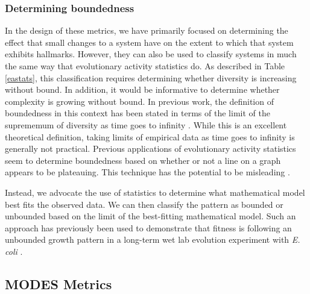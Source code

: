 \documentclass[letterpaper]{article}
\begin{document}
\subsubsection{Determining boundedness}

In the design of these metrics, we have primarily focused on determining the effect that small changes to a system have on the extent to which that system exhibits hallmarks. However, they can also be used to classify systems in much the same way that evolutionary activity statistics do. As described in Table \ref{eastats}, this classification requires determining whether diversity is increasing without bound. In addition, it would be informative to determine whether complexity is growing without bound. In previous work, the definition of boundedness in this context has been stated in terms of the limit of the suprememum of diversity as time goes to infinity \citep{bedau_classification_1998}. While this is an excellent theoretical definition, taking limits of empirical data as time goes to infinity is generally not practical. Previous applications of evolutionary activity statistics seem to determine boundedness based on whether or not a line on a graph appears to be plateauing. This technique has the potential to be misleading \citep{wiser_boundedness_2018}.

Instead, we advocate the use of statistics to determine what mathematical model best fits the observed data. We can then classify the pattern as bounded or unbounded based on the limit of the best-fitting mathematical model. Such an approach has previously been used to demonstrate that fitness is following an unbounded growth pattern in a long-term wet lab evolution experiment with \textit{E. coli} \citep{wiser_long-term_2013, lenski_sustained_2015}.

\subsection{MODES Metrics}
\end{document}
